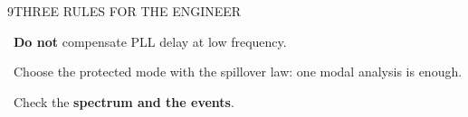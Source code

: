 \begin{minipage}[t][\PosterBottomRowHeight][t]{\PosterGridWidth}\vspace{0pt}
  \begin{PosterPanel}{\PosterBottomRowHeight}{9}{THREE RULES FOR THE ENGINEER}

    \noindent\begin{minipage}[t]{278mm}\vspace{0pt}
      {\fontsize{34pt}{38pt}\selectfont {}\ \textbf{Do not} compensate PLL delay at low frequency.\par}
    \end{minipage}\hfill%
    \begin{minipage}[t]{278mm}\vspace{0pt}
      {\fontsize{34pt}{38pt}\selectfont {}\ Choose the protected mode with the spillover law: one modal analysis is enough.\par}
    \end{minipage}\hfill%
    \begin{minipage}[t]{278mm}\vspace{0pt}
      {\fontsize{34pt}{38pt}\selectfont {}\ Check the \textbf{spectrum and the events}.\par}
    \end{minipage}\par

  \end{PosterPanel}
\end{minipage}%
